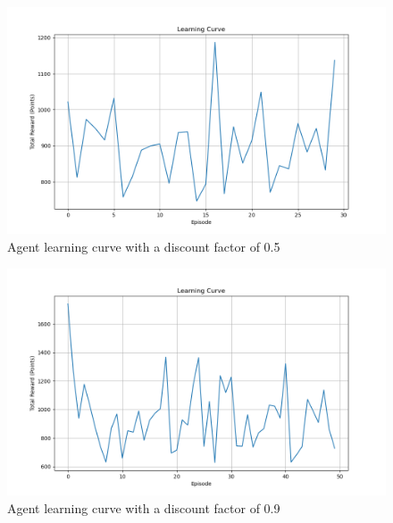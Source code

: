\begin{figure}[h]
    \centering
    \includegraphics[width=1.0\textwidth]{figs/learning_curve_0.5.png}
    \vskip 0.2in
    \caption{Agent learning curve with a discount factor of 0.5}
    \label{fig:learning_curve_0.5}
\end{figure}

\begin{figure}[h]
    \centering
    \includegraphics[width=1.0\textwidth]{figs/learning_curve_0.9.png}
    \vskip 0.2in
    \caption{Agent learning curve with a discount factor of 0.9}
    \label{fig:learning_curve_0.9}
\end{figure}
